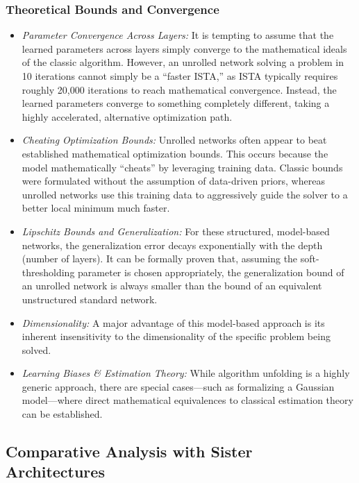 \documentclass[conference]{IEEEtran}
\begin{document}
\subsubsection{Theoretical Bounds and Convergence}
\begin{itemize}
    \item \textit{Parameter Convergence Across Layers:} It is tempting to assume that the learned parameters across layers simply converge to the mathematical ideals of the classic algorithm. However, an unrolled network solving a problem in 10 iterations cannot simply be a ``faster ISTA,'' as ISTA typically requires roughly 20,000 iterations to reach mathematical convergence. Instead, the learned parameters converge to something completely different, taking a highly accelerated, alternative optimization path.
    \item \textit{Cheating Optimization Bounds:} Unrolled networks often appear to beat established mathematical optimization bounds. This occurs because the model mathematically ``cheats'' by leveraging training data. Classic bounds were formulated without the assumption of data-driven priors, whereas unrolled networks use this training data to aggressively guide the solver to a better local minimum much faster.
    \item \textit{Lipschitz Bounds and Generalization:} For these structured, model-based networks, the generalization error decays exponentially with the depth (number of layers). It can be formally proven that, assuming the soft-thresholding parameter is chosen appropriately, the generalization bound of an unrolled network is always smaller than the bound of an equivalent unstructured standard network. 
    \item \textit{Dimensionality:} A major advantage of this model-based approach is its inherent insensitivity to the dimensionality of the specific problem being solved.
    \item \textit{Learning Biases \& Estimation Theory:} While algorithm unfolding is a highly generic approach, there are special cases—such as formalizing a Gaussian model—where direct mathematical equivalences to classical estimation theory can be established.
\end{itemize}

\subsection{Comparative Analysis with Sister Architectures}
\end{document}
